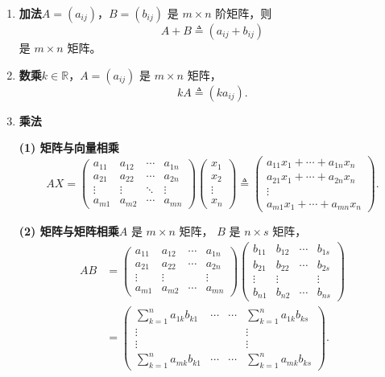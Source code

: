 \documentclass[UTF8,11pt]{ctexart}
\theoremstyle{cnthm}
\begin{document}
\begin{enumerate}
\item \textbf{加法}\quad $A=(a_{ij})$，$B=(b_{ij})$ 是
$m\times n$ 阶矩阵，则
\[
A+B\triangleq(a_{ij}+b_{ij})
\]
是 $m\times n$ 矩阵。
\item \textbf{数乘}\quad $k\in\mathbb R$，$A=(a_{ij})$ 是
$m\times n$ 矩阵，
\[
kA\triangleq(ka_{ij}).
\]
\item \textbf{乘法}

\textbf{(1) 矩阵与向量相乘}
\[
AX=
\begin{pmatrix}
a_{11} & a_{12} & \cdots & a_{1n}\\
a_{21} & a_{22} & \cdots & a_{2n}\\
\vdots & \vdots & \ddots & \vdots\\
a_{m1} & a_{m2} & \cdots & a_{mn}
\end{pmatrix}
\begin{pmatrix}
x_1\\x_2\\\vdots\\x_n
\end{pmatrix}
\triangleq
\begin{pmatrix}
a_{11}x_1+\cdots+a_{1n}x_n\\
a_{21}x_1+\cdots+a_{2n}x_n\\
\vdots\\
a_{m1}x_1+\cdots+a_{mn}x_n
\end{pmatrix}.
\]

\textbf{(2) 矩阵与矩阵相乘}\quad $A$ 是 $m\times n$ 矩阵，
$B$ 是 $n\times s$ 矩阵，
\[
\begin{aligned}
AB&=
\begin{pmatrix}
a_{11} & a_{12} & \cdots & a_{1n}\\
a_{21} & a_{22} & \cdots & a_{2n}\\
\vdots & \vdots & & \vdots\\
a_{m1} & a_{m2} & \cdots & a_{mn}
\end{pmatrix}
\begin{pmatrix}
b_{11} & b_{12} & \cdots & b_{1s}\\
b_{21} & b_{22} & \cdots & b_{2s}\\
\vdots & \vdots & & \vdots\\
b_{n1} & b_{n2} & \cdots & b_{ns}
\end{pmatrix}\\
&=
\begin{pmatrix}
\sum\limits_{k=1}^{n}a_{1k}b_{k1} & \cdots & \cdots
& \sum\limits_{k=1}^{n}a_{1k}b_{ks}\\
\vdots & & & \vdots\\
\vdots & & & \vdots\\
\sum\limits_{k=1}^{n}a_{mk}b_{k1} & \cdots & \cdots
& \sum\limits_{k=1}^{n}a_{mk}b_{ks}
\end{pmatrix}.
\end{aligned}
\]
\end{enumerate}
\end{document}
